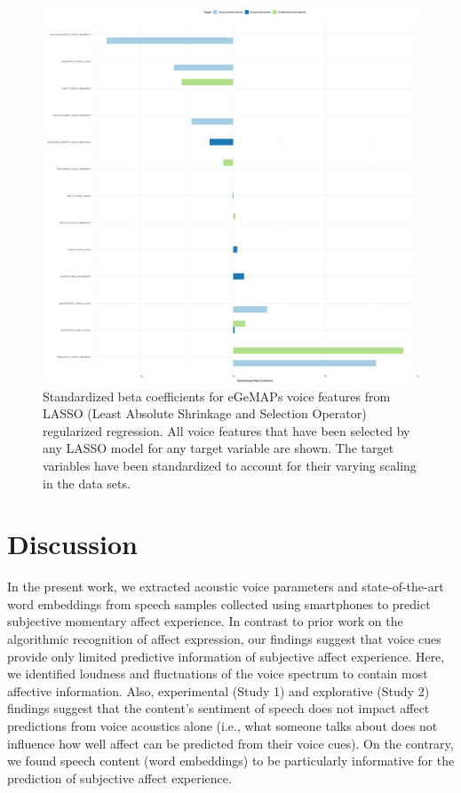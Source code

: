 \documentclass[
  english,
  man,floatsintext]{apa6}
\begin{document}
\begin{figure}

{\centering \includegraphics[width=1\linewidth,height=1\textheight]{../figures/betas_plot} 

}

\caption[LASSO betas]{Standardized beta coefficients for eGeMAPs voice features from LASSO (Least Absolute Shrinkage and Selection Operator) regularized regression. All voice features that have been selected by any LASSO model for any target variable are shown. The target variables have been standardized to account for their varying scaling in the data sets.}\label{fig:lassobetas}
\end{figure}
\newpage

\hypertarget{discussion}{%
\section{Discussion}\label{discussion}}

In the present work, we extracted acoustic voice parameters and state-of-the-art word embeddings from speech samples collected using smartphones to predict subjective momentary affect experience. In contrast to prior work on the algorithmic recognition of affect expression, our findings suggest that voice cues provide only limited predictive information of subjective affect experience. Here, we identified loudness and fluctuations of the voice spectrum to contain most affective information. Also, experimental (Study 1) and explorative (Study 2) findings suggest that the content's sentiment of speech does not impact affect predictions from voice acoustics alone (i.e., what someone talks about does not influence how well affect can be predicted from their voice cues). On the contrary, we found speech content (word embeddings) to be particularly informative for the prediction of subjective affect experience.
\end{document}

